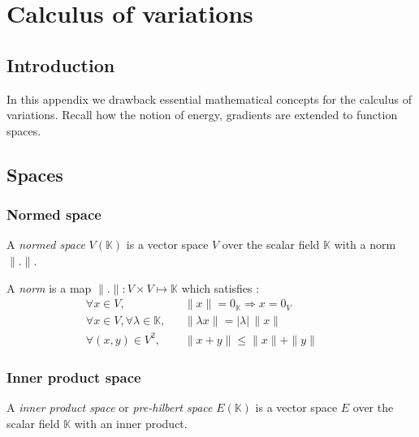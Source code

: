 \chapter{Calculus of variations}

\section{Introduction}
In this appendix we drawback essential mathematical concepts for the calculus of variations.
Recall how the notion of energy, gradients are extended to function spaces.

\cite{Abraham2002}

\section{Spaces}

\subsection{Normed space}
A \emph{normed space} $V(\mathbb{K})$ is a vector space $V$ over the scalar field $\mathbb{K}$ with a norm $\|.\|$.

A \emph{norm} is a map $\| . \| : V \times V \longmapsto \mathbb{K}$ which satisfies :
\begin{align}
	&\forall x \in V, 							&& \|x\| = 0_\mathbb{K} \Rightarrow x = 0_V&&&\\
	&\forall x \in V, \forall \lambda \in \mathbb{K}, 	&& \|\lambda x\| = |\lambda| \,\|x\|&&&\\
	&\forall (x,y) \in V^2, 						&& \|x + y\| \leqslant \|x\| + \|y\|&&&
\end{align}

\subsection{Inner product space}
A \emph{inner product space} or \emph{pre-hilbert space} $E(\mathbb{K})$ is a vector space $E$ over the scalar field $\mathbb{K}$ with an inner product.


